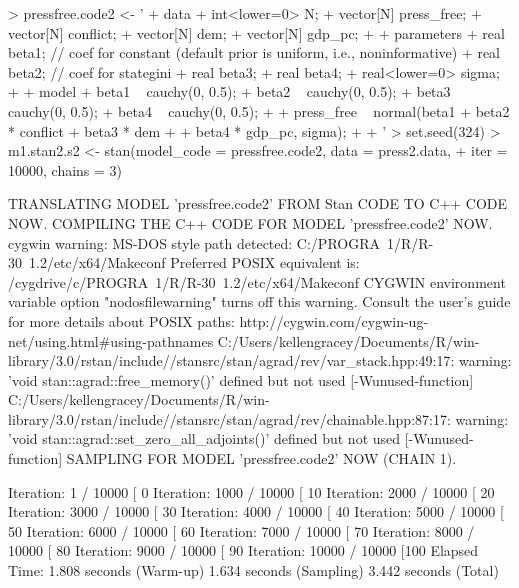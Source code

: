 \documentclass[12pt]{article}
\begin{document}
\begin{enumerate}
\begin{Schunk}
\begin{Sinput}
> pressfree.code2 <- '
+     data {
+         int<lower=0> N;
+         vector[N] press_free;
+         vector[N] conflict;
+         vector[N] dem;
+         vector[N] gdp_pc;
+     }
+     parameters {                
+         real beta1;             // coef for constant (default prior is uniform, i.e., noninformative)
+         real beta2;             // coef for stategini
+         real beta3;
+         real beta4;
+         real<lower=0> sigma;
+     }
+     model {
+         beta1 ~ cauchy(0, 0.5);
+         beta2 ~ cauchy(0, 0.5);
+         beta3 ~ cauchy(0, 0.5);
+         beta4 ~ cauchy(0, 0.5);
+         
+         press_free ~ normal(beta1 + beta2 * conflict + beta3 * dem +
+         beta4 * gdp_pc, sigma);
+     }
+ '
> set.seed(324)
> m1.stan2.s2 <- stan(model_code = pressfree.code2, data = press2.data, 
+                 iter = 10000, chains = 3)
\end{Sinput}
\begin{Soutput}
TRANSLATING MODEL 'pressfree.code2' FROM Stan CODE TO C++ CODE NOW.
COMPILING THE C++ CODE FOR MODEL 'pressfree.code2' NOW.
cygwin warning:
  MS-DOS style path detected: C:/PROGRA~1/R/R-30~1.2/etc/x64/Makeconf
  Preferred POSIX equivalent is: /cygdrive/c/PROGRA~1/R/R-30~1.2/etc/x64/Makeconf
  CYGWIN environment variable option "nodosfilewarning" turns off this warning.
  Consult the user's guide for more details about POSIX paths:
    http://cygwin.com/cygwin-ug-net/using.html#using-pathnames
C:/Users/kellengracey/Documents/R/win-library/3.0/rstan/include//stansrc/stan/agrad/rev/var_stack.hpp:49:17: warning: 'void stan::agrad::free_memory()' defined but not used [-Wunused-function]
C:/Users/kellengracey/Documents/R/win-library/3.0/rstan/include//stansrc/stan/agrad/rev/chainable.hpp:87:17: warning: 'void stan::agrad::set_zero_all_adjoints()' defined but not used [-Wunused-function]
SAMPLING FOR MODEL 'pressfree.code2' NOW (CHAIN 1).

Iteration:    1 / 10000 [  0%
Iteration: 1000 / 10000 [ 10%
Iteration: 2000 / 10000 [ 20%
Iteration: 3000 / 10000 [ 30%
Iteration: 4000 / 10000 [ 40%
Iteration: 5000 / 10000 [ 50%
Iteration: 6000 / 10000 [ 60%
Iteration: 7000 / 10000 [ 70%
Iteration: 8000 / 10000 [ 80%
Iteration: 9000 / 10000 [ 90%
Iteration: 10000 / 10000 [100%
Elapsed Time: 1.808 seconds (Warm-up)
              1.634 seconds (Sampling)
              3.442 seconds (Total)


\end{Soutput}
\end{Schunk}
\end{enumerate}
\end{document}
